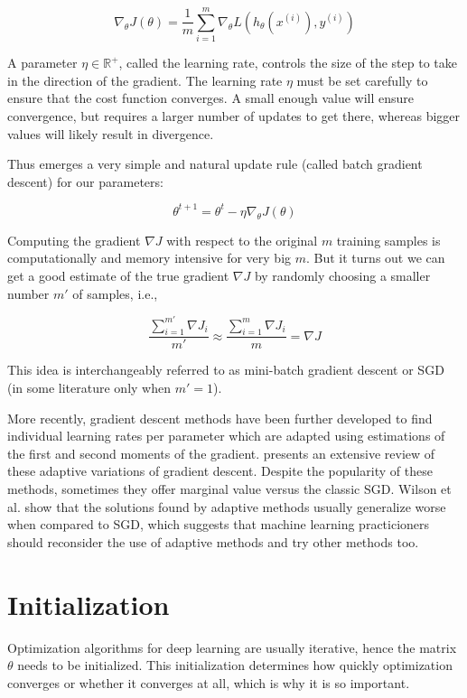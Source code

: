 $$
\nabla_{\theta} J(\theta) = \frac{1}{m} \sum_{i=1}^{m} \nabla_{\theta} L(h_{\theta}(x^{(i)}), y^{(i)})
$$

A parameter $\eta \in \mathbb{{R}^{+}}$, called the learning rate, controls the size of the step to take in the direction of the gradient.
The learning rate $\eta$ must be set carefully to ensure that the cost function converges. A small enough value will ensure convergence, but requires a larger number of updates to get there, whereas bigger values will likely result in divergence.

Thus emerges a very simple and natural update rule (called batch gradient descent) for our parameters:

$$
\theta^{t+1} = \theta^t - \eta \nabla_{\theta} J(\theta)
$$

Computing the gradient $\nabla J$ with respect to the original $m$ training samples is computationally and memory intensive for very big $m$. But it turns out we can get a good estimate of the true gradient $\nabla J$ by randomly choosing a smaller number $m'$ of samples, i.e.,

$$
\frac{\sum_{i=1}^{m'} \nabla J_i}{m'} \approx \frac{\sum_{i=1}^m \nabla J_{i}}{m} = \nabla J
$$

This idea is interchangeably referred to as mini-batch gradient descent or \ac{SGD} (in some literature only when $m' = 1$).

More recently, gradient descent methods have been further developed to find individual learning rates per parameter which are adapted using estimations of the first and second moments of the gradient. \citeauthor{ruder2016} \cite{ruder2016} presents an extensive review of these adaptive variations of gradient descent. Despite the popularity of these methods, sometimes they offer marginal value versus the classic \ac{SGD}. Wilson et al. \cite{wilson2017} show that the solutions found by adaptive methods usually generalize worse when compared to \ac{SGD}, which suggests that machine learning practicioners should reconsider the use of adaptive methods and try other methods too.

\section{Initialization}

Optimization algorithms for deep learning are usually iterative, hence the matrix $\theta$ needs to be initialized. This initialization determines how quickly optimization converges or whether it converges at all, which is why it is so important.

